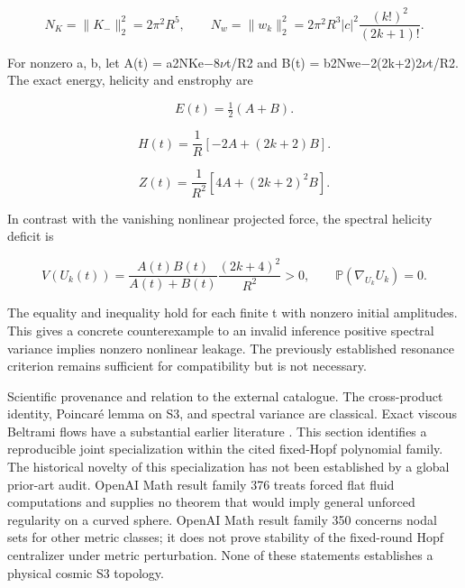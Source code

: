 \documentclass[10pt,letterpaper]{article}
\theoremstyle{remark}
\begin{document}
\begin{equation}
\tag{67}\label{eq:67}
N_K=\|K_-\|_2^2=2\pi^2R^5,\qquad N_w=\|w_k\|_2^2=2\pi^2R^3|c|^2\frac{(k!)^2}{(2k+1)!}.
\end{equation}

For nonzero a, b, let A(t) = a2NKe\(- \)8\(\nu \)t/R2 and B(t) = b2Nwe\(- \)2(2k+2)2\(\nu \)t/R2. The exact energy, helicity and enstrophy are



\begin{equation}
\tag{68}\label{eq:68}
E(t)=\tfrac12(A+B).
\end{equation}


\begin{equation}
\tag{69}\label{eq:69}
H(t)=\frac1R[-2A+(2k+2)B].
\end{equation}


\begin{equation}
\tag{70}\label{eq:70}
Z(t)=\frac1{R^2}[4A+(2k+2)^2B].
\end{equation}

In contrast with the vanishing nonlinear projected force, the spectral helicity deficit is



\begin{equation}
\tag{71}\label{eq:71}
V(U_k(t))=\frac{A(t)B(t)}{A(t)+B(t)}\frac{(2k+4)^2}{R^2}>0,\qquad\mathbb P(\nabla_{U_k}U_k)=0.
\end{equation}

The equality and inequality hold for each finite t with nonzero initial amplitudes. This gives a concrete counterexample to an invalid inference positive spectral variance implies nonzero nonlinear leakage. The previously established resonance criterion remains sufficient for compatibility but is not necessary.


Scientific provenance and relation to the external catalogue. The cross-product identity, Poincaré lemma on S3, and spectral variance are classical. Exact viscous Beltrami flows have a substantial earlier literature \cite{ref15,ref16}. This section identifies a reproducible joint specialization within the cited fixed-Hopf polynomial family. The historical novelty of this specialization has not been established by a global prior-art audit. OpenAI Math result family 376 treats forced flat fluid computations and supplies no theorem that would imply general unforced regularity on a curved sphere. OpenAI Math result family 350 concerns nodal sets for other metric classes; it does not prove stability of the fixed-round Hopf centralizer under metric perturbation. None of these statements establishes a physical cosmic S3 topology.
\end{document}
